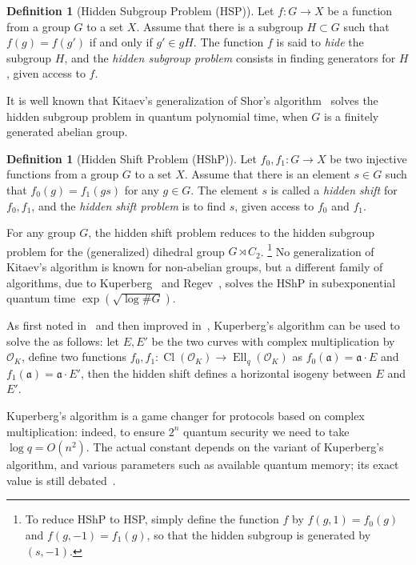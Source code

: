 \documentclass[10pt]{article}
\theoremstyle{plain}
\theoremstyle{definition}
\newtheorem{definition}[theorem]{Definition}
\DeclareMathOperator{\Cl}{Cl}
\DeclareMathOperator{\Ell}{Ell}
\def\O{\ensuremath{\mathcal{O}}}
\def\a{\ensuremath{\mathfrak{a}}}
\begin{document}
\begin{definition}[Hidden Subgroup Problem (HSP)]
  Let $f:G→X$ be a function from a group $G$ to a set $X$. %
  Assume that there is a subgroup $H⊂G$ such that $f(g)=f(g')$ if and
  only if $g'∈gH$. %
  The function $f$ is said to \emph{hide} the subgroup $H$, and the
  \emph{hidden subgroup problem} consists in finding generators for
  $H$, given access to $f$.
\end{definition}

It is well known that Kitaev's generalization of Shor's
algorithm~\cite{kitaev1995hsp} solves the hidden subgroup problem in
quantum polynomial time, when $G$ is a finitely generated abelian
group. %

\begin{definition}[Hidden Shift Problem (HShP)]
  Let $f_0,f_1:G→X$ be two injective functions from a group $G$ to a
  set $X$. %
  Assume that there is an element $s∈G$ such that $f_0(g)=f_1(gs)$ for
  any $g∈G$. %
  The element $s$ is called a \emph{hidden shift} for $f_0,f_1$, and
  the \emph{hidden shift problem} is to find $s$, given access to
  $f_0$ and $f_1$. %
\end{definition}

For any group $G$, the hidden shift problem reduces to the hidden
subgroup problem for the (generalized) dihedral group $G\rtimes C_2$.%
\footnote{To reduce HShP to HSP, simply define the function $f$ by
  $f(g,1) = f_0(g)$ and $f(g,-1) = f_1(g)$, so that the hidden
  subgroup is generated by $(s,-1)$.} %
No generalization of Kitaev's algorithm is known for non-abelian
groups, but a different family of algorithms, due to
Kuperberg~\cite{Kup,Kuperberg2013} and Regev~\cite{regev04}, solves
the HShP in subexponential quantum time $\exp(\sqrt{\log\#G})$. %

As first noted in~\cite{childs2014constructing} and then improved
in~\cite{BIJ18,Jao-etal-kuperberg-2018,EC:BonSch20,EC:Peikert20},
Kuperberg's algorithm can be used to solve the  as
follows: let $E,E'$ be the two curves with complex multiplication by
$\O_K$, define two functions $f_0,f_1:\Cl(\O_K)\to\Ell_q(\O_K)$ as
$f_0(\a)=\a·E$ and $f_1(\a)=\a·E'$, then the hidden shift defines a
horizontal isogeny between $E$ and $E'$. %

Kuperberg's algorithm is a game changer for protocols based on complex
multiplication: indeed, to ensure $2^n$ quantum security we need to
take $\log q=O(n^2)$. %
The actual constant depends on the variant of Kuperberg's algorithm,
and various parameters such as available quantum memory; its exact
value is still
debated~\cite{EC:BLMP19,EC:Peikert20,cryptoeprint:2020:1520}.
\end{document}
